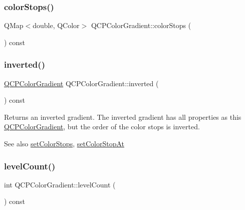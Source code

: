 \subsubsection{\texorpdfstring{color\+Stops()}{colorStops()}}
{\footnotesize\ttfamily Q\+Map$<$double, Q\+Color$>$ Q\+C\+P\+Color\+Gradient\+::color\+Stops (\begin{DoxyParamCaption}{ }\end{DoxyParamCaption}) const\hspace{0.3cm}{\ttfamily [inline]}}

\mbox{\label{class_q_c_p_color_gradient_a9f72f501de429829ec446333316decda}} 
\subsubsection{\texorpdfstring{inverted()}{inverted()}}
{\footnotesize\ttfamily \hyperlink{class_q_c_p_color_gradient}{Q\+C\+P\+Color\+Gradient} Q\+C\+P\+Color\+Gradient\+::inverted (\begin{DoxyParamCaption}{ }\end{DoxyParamCaption}) const}

Returns an inverted gradient. The inverted gradient has all properties as this \hyperlink{class_q_c_p_color_gradient}{Q\+C\+P\+Color\+Gradient}, but the order of the color stops is inverted.

\begin{DoxySeeAlso}{See also}
\hyperlink{class_q_c_p_color_gradient_a724e828aa6f0ba5011a9392477c35d3a}{set\+Color\+Stops}, \hyperlink{class_q_c_p_color_gradient_a3b48be5e78079db1bb2a1188a4c3390e}{set\+Color\+Stop\+At} 
\end{DoxySeeAlso}
\mbox{\label{class_q_c_p_color_gradient_ac4b9d7034fc3b6c76318b05075367090}} 
\subsubsection{\texorpdfstring{level\+Count()}{levelCount()}}
{\footnotesize\ttfamily int Q\+C\+P\+Color\+Gradient\+::level\+Count (\begin{DoxyParamCaption}{ }\end{DoxyParamCaption}) const\hspace{0.3cm}{\ttfamily [inline]}}

